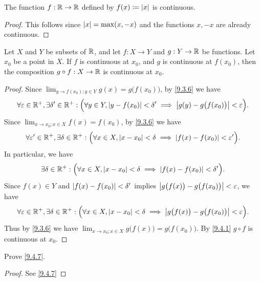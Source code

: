 \begin{prop}\label{9.4.12}
  The function \(f : \mathbb{R} \to \mathbb{R}\) defined by \(f(x) \coloneqq \left\lvert x\right\rvert\) is continuous.
\end{prop}

\begin{proof}
  This follows since \(\left\lvert x\right\rvert = \max(x, -x)\) and the functions \(x, -x\) are already continuous.
\end{proof}

\begin{prop}\label{9.4.13}
  Let \(X\) and \(Y\) be subsets of \(\mathbb{R}\), and let \(f : X \to Y\) and \(g : Y \to \mathbb{R}\) be functions.
  Let \(x_0\) be a point in \(X\).
  If \(f\) is continuous at \(x_0\), and \(g\) is continuous at \(f(x_0)\), then the composition \(g \circ f : X \to \mathbb{R}\) is continuous at \(x_0\).
\end{prop}

\begin{proof}
  Since \(\lim_{y \to f(x_0) ; y \in Y} g(x) = g\big(f(x_0)\big)\), by \cref{9.3.6} we have
  \[
    \forall \varepsilon \in \mathbb{R}^+, \exists \delta' \in \mathbb{R}^+ : \Big(\forall y \in Y, \left\lvert y - f(x_0)\right\rvert < \delta' \implies \left\lvert g(y) - g\big(f(x_0)\big)\right\rvert < \varepsilon\Big).
  \]
  Since \(\lim_{x \to x_0 ; x \in X} f(x) = f(x_0)\), by \cref{9.3.6} we have
  \[
    \forall \varepsilon' \in \mathbb{R}^+, \exists \delta \in \mathbb{R}^+ : \Big(\forall x \in X, \left\lvert x - x_0\right\rvert < \delta \implies \left\lvert f(x) - f(x_0)\right\rvert < \varepsilon'\Big).
  \]
  In particular, we have
  \[
    \exists \delta \in \mathbb{R}^+ : \Big(\forall x \in X, \left\lvert x - x_0\right\rvert < \delta \implies \left\lvert f(x) - f(x_0)\right\rvert < \delta'\Big).
  \]
  Since \(f(x) \in Y\) and \(\left\lvert f(x) - f(x_0)\right\rvert < \delta'\) implies \(\left\lvert g\big(f(x)\big) - g\big(f(x_0)\big)\right\rvert < \varepsilon\), we have
  \[
    \forall \varepsilon \in \mathbb{R}^+, \exists \delta \in \mathbb{R}^+ : \Big(\forall x \in X, \left\lvert x - x_0\right\rvert < \delta \implies \left\lvert g\big(f(x)\big) - g\big(f(x_0)\big)\right\rvert < \varepsilon\Big).
  \]
  Thus by \cref{9.3.6} we have \(\lim_{x \to x_0 ; x \in X} g\big(f(x)\big) = g\big(f(x_0)\big)\).
  By \cref{9.4.1} \(g \circ f\) is continuous at \(x_0\).
\end{proof}

\exercisesection

\begin{ex}\label{ex:9.4.1}
  Prove \cref{9.4.7}.
\end{ex}

\begin{proof}
  See \cref{9.4.7}
\end{proof}

